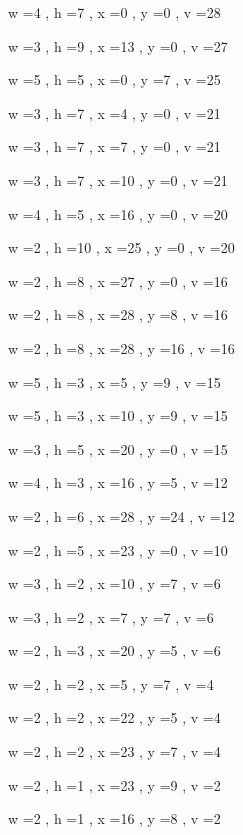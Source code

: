 \documentclass[11pt]{article}
\begin{document}


w =4 , h =7 , x =0 , y =0 , v =28
\par
w =3 , h =9 , x =13 , y =0 , v =27
\par
w =5 , h =5 , x =0 , y =7 , v =25
\par
w =3 , h =7 , x =4 , y =0 , v =21
\par
w =3 , h =7 , x =7 , y =0 , v =21
\par
w =3 , h =7 , x =10 , y =0 , v =21
\par
w =4 , h =5 , x =16 , y =0 , v =20
\par
w =2 , h =10 , x =25 , y =0 , v =20
\par
w =2 , h =8 , x =27 , y =0 , v =16
\par
w =2 , h =8 , x =28 , y =8 , v =16
\par
w =2 , h =8 , x =28 , y =16 , v =16
\par
w =5 , h =3 , x =5 , y =9 , v =15
\par
w =5 , h =3 , x =10 , y =9 , v =15
\par
w =3 , h =5 , x =20 , y =0 , v =15
\par
w =4 , h =3 , x =16 , y =5 , v =12
\par
w =2 , h =6 , x =28 , y =24 , v =12
\par
w =2 , h =5 , x =23 , y =0 , v =10
\par
w =3 , h =2 , x =10 , y =7 , v =6
\par
w =3 , h =2 , x =7 , y =7 , v =6
\par
w =2 , h =3 , x =20 , y =5 , v =6
\par
w =2 , h =2 , x =5 , y =7 , v =4
\par
w =2 , h =2 , x =22 , y =5 , v =4
\par
w =2 , h =2 , x =23 , y =7 , v =4
\par
w =2 , h =1 , x =23 , y =9 , v =2
\par
w =2 , h =1 , x =16 , y =8 , v =2
\par
\newpage
\end{document}
